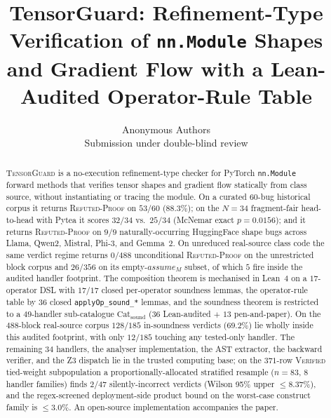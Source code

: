 \documentclass{article}
\title{TensorGuard: Refinement-Type Verification of \texttt{nn.Module}
  Shapes and Gradient Flow with a Lean-Audited Operator-Rule Table}
\author{Anonymous Authors\\Submission under double-blind review}
\theoremstyle{definition}
\begin{document}
\maketitle

\begin{abstract}
\textsc{TensorGuard} is a no-execution refinement-type checker for
PyTorch \texttt{nn.Module} forward methods that verifies tensor
shapes and gradient flow statically from class source, without
instantiating or tracing the module.
On a curated $60$-bug historical corpus it returns
\textsc{Refuted-Proof} on $53/60$ ($88.3\%$); on the $N{=}34$
fragment-fair head-to-head with Pytea it scores $32/34$ vs.\
$25/34$ (McNemar exact $p{=}0.0156$); and it returns
\textsc{Refuted-Proof} on $9/9$ naturally-occurring HuggingFace
shape bugs across Llama, Qwen2, Mistral, Phi-3, and Gemma~$2$.
On unreduced real-source class code the same verdict regime
returns $0/488$ unconditional \textsc{Refuted-Proof} on the
unrestricted block corpus and $26/356$ on its
empty-$\mathit{assume}_M$ subset, of which $5$ fire inside the
audited handler footprint.
The composition theorem is mechanised in Lean~$4$ on a
$17$-operator DSL with $17/17$ closed per-operator soundness
lemmas, the operator-rule table by $36$ closed
\texttt{applyOp\_sound\_*} lemmas, and the soundness theorem is
restricted to a $49$-handler sub-catalogue
$\mathrm{Cat}_{\mathrm{sound}}$ ($36$ Lean-audited $+$ $13$
pen-and-paper). On the $488$-block real-source corpus
$128/185$ in-soundness verdicts ($69.2\%$) lie wholly inside
this audited footprint, with only $12/185$ touching any
tested-only handler. The remaining $34$ handlers, the analyser
implementation, the AST extractor, the backward verifier, and
the Z3 dispatch lie in the trusted computing base; on the
$371$-row \textsc{Verified} tied-weight subpopulation a
proportionally-allocated stratified resample ($n{=}83$,
$8$ handler families) finds $2/47$ silently-incorrect verdicts
(Wilson 95\% upper $\le 8.37\%$), and the regex-screened
deployment-side product bound on the worst-case construct
family is $\le 3.0\%$. An open-source implementation
accompanies the paper.
\end{abstract}














\clearpage



\appendix



\end{document}
